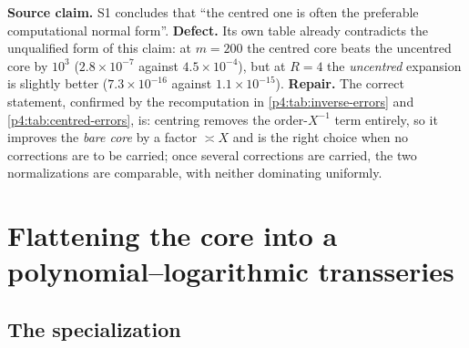 \documentclass[11pt,a4paper,oneside]{book}
\theoremstyle{plain}
\theoremstyle{definition}
\theoremstyle{remark}
\newcommand{\Xcore}{X}
\begin{document}
\begin{repairbox}
\textbf{Source claim.}  \textsf{S1} concludes that ``the centred one is often
the preferable computational normal form''.  \textbf{Defect.}  Its own table
already contradicts the unqualified form of this claim: at $m=200$ the centred
core beats the uncentred core by $10^{3}$ ($2.8\times10^{-7}$ against
$4.5\times10^{-4}$), but at $R=4$ the \emph{uncentred} expansion is slightly
better ($7.3\times10^{-16}$ against $1.1\times10^{-15}$).  \textbf{Repair.}
The correct statement, confirmed by the recomputation in
\cref{p4:tab:inverse-errors} and \cref{p4:tab:centred-errors}, is: centring
removes the order-$\Xcore^{-1}$ term entirely, so it improves the \emph{bare
core} by a factor $\asymp\Xcore$ and is the right choice when no corrections
are to be carried; once several corrections are carried, the two
normalizations are comparable, with neither dominating uniformly.
\end{repairbox}

\section{Flattening the core into a polynomial--logarithmic transseries}
\label{p4:sec:flatten}

\subsection{The specialization}
\end{document}
